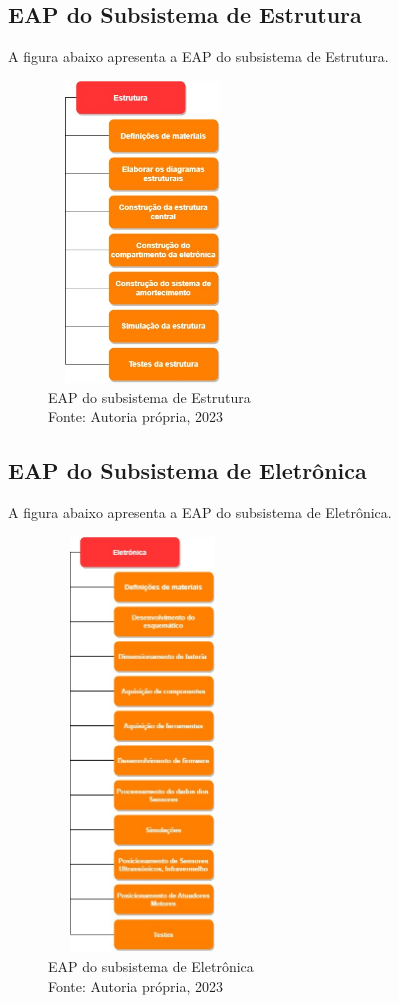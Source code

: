 \subsection{EAP do Subsistema de Estrutura}
A figura abaixo apresenta a EAP do subsistema de Estrutura.
\begin{figure}[H]
\begin{center}
\includegraphics[width= 5cm, height=8cm]{figuras/Fig11.jpg}
\caption{EAP do subsistema de Estrutura \\ Fonte: Autoria própria, 2023}
\label{Fig11}
\end{center}
\end{figure}

\subsection{EAP do Subsistema de Eletrônica}
A figura abaixo apresenta a EAP do subsistema de Eletrônica.

\begin{figure}[H]
\begin{center}
\includegraphics[width= 5cm, height=11cm]{figuras/Fig12.jpg}
\caption{EAP do subsistema de Eletrônica \\ Fonte: Autoria própria, 2023}
\label{Fig12}
\end{center}
\end{figure}

